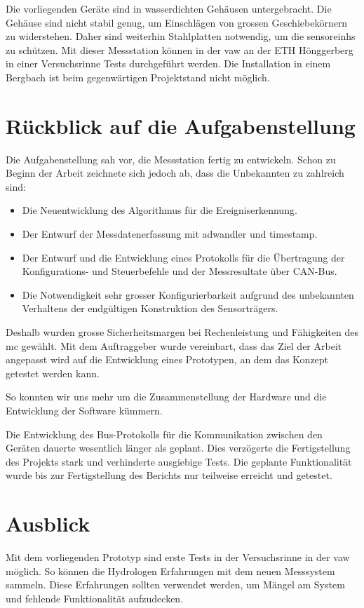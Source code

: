 Die vorliegenden Geräte sind in wasserdichten Gehäusen untergebracht. Die Gehäuse sind nicht stabil genug, um Einschlägen von grossen Geschiebekörnern zu widerstehen. Daher sind weiterhin Stahlplatten notwendig, um die \glspl{sensoreinh} zu schützen. Mit dieser Messstation können in der \gls{vaw} an der ETH Hönggerberg in einer Versuchsrinne Tests durchgeführt werden. Die Installation in einem Bergbach ist beim gegenwärtigen Projektstand nicht möglich.

\section{Rückblick auf die Aufgabenstellung}
Die Aufgabenstellung sah vor, die Messstation fertig zu entwickeln. Schon zu Beginn der Arbeit zeichnete sich jedoch ab, dass die Unbekannten zu zahlreich sind:
\begin{itemize}
\item Die Neuentwicklung des Algorithmus für die Ereigniserkennung.
\item Der Entwurf der Messdatenerfassung mit \gls{adwandler} und \gls{timestamp}.
\item Der Entwurf und die Entwicklung eines Protokolls für die Übertragung der Konfigurations- und Steuerbefehle und der Messresultate über CAN-Bus.
\item Die Notwendigkeit sehr grosser Konfigurierbarkeit aufgrund des unbekannten Verhaltens der endgültigen Konstruktion des Sensorträgers.
\end{itemize}

Deshalb wurden grosse Sicherheitsmargen bei Rechenleistung und Fähigkeiten des \gls{mc} gewählt. Mit dem Auftraggeber wurde vereinbart, dass das Ziel der Arbeit angepasst wird auf die Entwicklung eines Prototypen, an dem das Konzept getestet werden kann.

So konnten wir uns mehr um die Zusammenstellung der Hardware und die Entwicklung der Software kümmern.

Die Entwicklung des Bus-Protokolls für die Kommunikation zwischen den Geräten dauerte wesentlich länger als geplant. Dies verzögerte die Fertigstellung des Projekts stark und verhinderte ausgiebige Tests. Die geplante Funktionalität wurde bis zur Fertigstellung des Berichts nur teilweise erreicht und getestet.

\section{Ausblick}
Mit dem vorliegenden Prototyp sind erste Tests in der Versuchsrinne in der \gls{vaw} möglich. So können die Hydrologen Erfahrungen mit dem neuen Messsystem sammeln. Diese Erfahrungen sollten verwendet werden, um Mängel am System und fehlende Funktionalität aufzudecken. 

